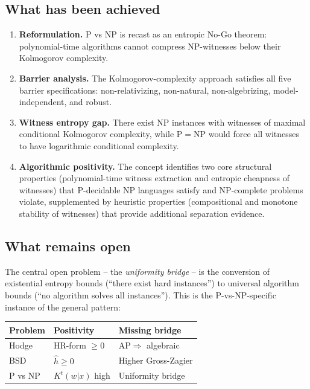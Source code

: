 \documentclass[aps,prd,twocolumn,superscriptaddress,nofootinbib]{revtex4-2}
\theoremstyle{definition}
\theoremstyle{remark}
\newcommand{\NP}{\mathrm{NP}}
\newcommand{\PP}{\mathrm{P}}
\begin{document}
\subsection{What has been achieved}

\begin{enumerate}
\item \textbf{Reformulation.} $\PP$ vs $\NP$ is recast as an entropic No-Go theorem: polynomial-time algorithms cannot compress NP-witnesses below their Kolmogorov complexity.

\item \textbf{Barrier analysis.} The Kolmogorov-complexity approach satisfies all five barrier specifications: non-relativizing, non-natural, non-algebrizing, model-independent, and robust.

\item \textbf{Witness entropy gap.} There exist NP instances with witnesses of maximal conditional Kolmogorov complexity, while $\PP = \NP$ would force all witnesses to have logarithmic conditional complexity.

\item \textbf{Algorithmic positivity.} The concept identifies two core structural properties (polynomial-time witness extraction and entropic cheapness of witnesses) that $\PP$-decidable NP languages satisfy and NP-complete problems violate, supplemented by heuristic properties (compositional and monotone stability of witnesses) that provide additional separation evidence.
\end{enumerate}

\subsection{What remains open}

The central open problem -- the \textit{uniformity bridge} -- is the conversion of existential entropy bounds (``there exist hard instances'') to universal algorithm bounds (``no algorithm solves all instances''). This is the P-vs-NP-specific instance of the general pattern:

\begin{center}
\begin{tabular}{lll}
\hline
Problem & Positivity & Missing bridge \\
\hline
Hodge & HR-form $\geq 0$ & $\mathrm{AP} \Rightarrow$ algebraic \\
BSD & $\hat{h} \geq 0$ & Higher Gross-Zagier \\
P vs NP & $K^t(w|x)$ high & Uniformity bridge \\
\hline
\end{tabular}
\end{center}
\end{document}
